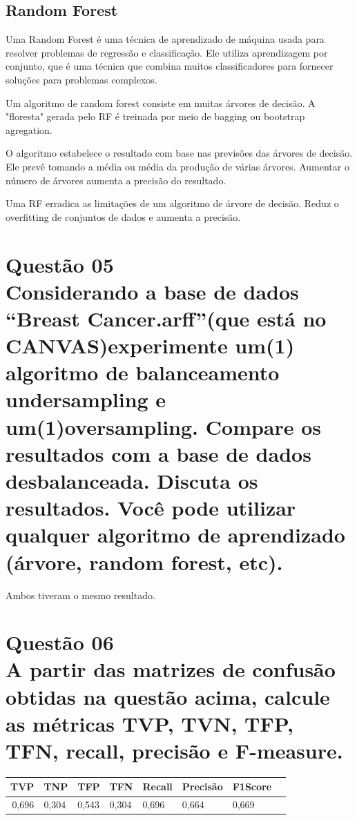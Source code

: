 \documentclass[12pt]{article}
\begin{document}
\subsection{Random Forest}
Uma Random Forest é uma técnica de aprendizado de máquina usada para resolver problemas de regressão e classificação.
Ele utiliza aprendizagem por conjunto, que é uma técnica que combina muitos classificadores para fornecer soluções para problemas complexos.

Um algoritmo de random forest consiste em muitas árvores de decisão.
A "floresta" gerada pelo RF é treinada por meio de bagging ou bootstrap agregation.

O algoritmo estabelece o resultado com base nas previsões das árvores de decisão.
Ele prevê tomando a média ou média da produção de várias árvores.
Aumentar o número de árvores aumenta a precisão do resultado.

Uma RF erradica as limitações de um algoritmo de árvore de decisão.
Reduz o overfitting de conjuntos de dados e aumenta a precisão.


\section{Questão 05\\
  Considerando a base de dados “Breast Cancer.arff”(que está no CANVAS)experimente um(1) algoritmo de balanceamento undersampling e um(1)oversampling.
  Compare os resultados com a base de dados desbalanceada.
  Discuta os resultados.
  Você pode utilizar qualquer algoritmo de aprendizado (árvore, random forest, etc).
 }

Ambos tiveram o mesmo resultado.


\section{Questão 06\\
  A partir das matrizes de confusão obtidas na questão acima, calcule as métricas TVP, TVN, TFP, TFN, recall, precisão e F-measure.
 }

\begin{center}
	\begin{tabular}{| r | l | l | l | l | l | l | l |}
		\hline
		\textbf{TVP} & \textbf{TNP} & \textbf{TFP} & \textbf{TFN} & \textbf{Recall} & \textbf{Precisão} & \textbf{F1Score} \\ \hline
		0,696        & 0,304        & 0,543        & 0,304        & 0,696           & 0,664             & 0,669            \\ \hline
	\end{tabular}
\end{center}
\end{document}
